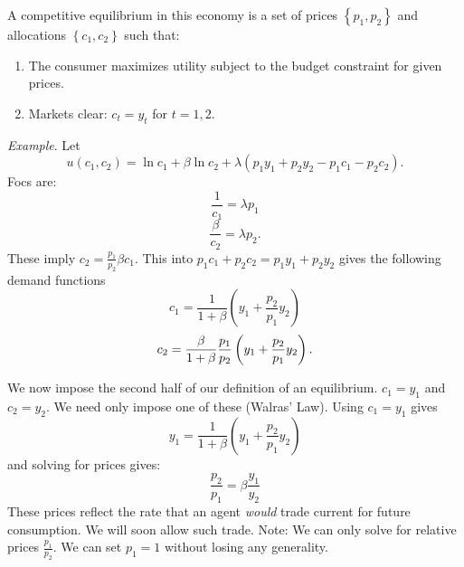 \documentclass{sebase}
\begin{document}
A competitive equilibrium in this economy is a set of prices $\left\{
p_{1},p_{2}\right\} $ and allocations $\left\{ c_{1},c_{2}\right\} $ such
that:

\begin{enumerate}
\item The consumer maximizes utility subject to the budget constraint for
given prices.

\item Markets clear: $c_{t}=y_{t}$ for $t=1,2$.
\end{enumerate}

\pagebreak

\textit{Example}. Let%
\begin{equation*}
u\left( c_{1},c_{2}\right) =\ln c_{1}+\beta \ln c_{2}+\lambda \left(
p_{1}y_{1}+p_{2}y_{2}-p_{1}c_{1}-p_{2}c_{2}\right) .
\end{equation*}%
Focs are:%
\begin{equation*}
\frac{1}{c_{1}}=\lambda p_{1}
\end{equation*}%
\begin{equation*}
\frac{\beta }{c_{2}}=\lambda p_{2}.
\end{equation*}%
These imply $c_{2}=\frac{p_{1}}{p_{2}}\beta c_{1}.$ This into $%
p_{1}c_{1}+p_{2}c_{2}=p_{1}y_{1}+p_{2}y_{2}$ gives the following demand
functions%
\begin{equation*}
c_{1}=\frac{1}{1+\beta }\left( y_{1}+\frac{p_{2}}{p_{1}}y_{2}\right)
\end{equation*}%
\begin{equation*}
c_{2}=\frac{\beta }{1+\beta }\frac{p_{1}}{p_{2}}\left( y_{1}+\frac{p_{2}}{%
p_{1}}y_{2}\right) .
\end{equation*}%
\pagebreak

We now impose the second half of our definition of an equilibrium. $%
c_{1}=y_{1}$ and $c_{2}=y_{2}$. We need only impose one of these (Walras'
Law). Using $c_{1}=y_{1}$ gives 
\begin{equation*}
y_{1}=\frac{1}{1+\beta }\left( y_{1}+\frac{p_{2}}{p_{1}}y_{2}\right)
\end{equation*}%
and solving for prices gives:%
\begin{equation*}
\frac{p_{2}}{p_{1}}=\beta \frac{y_{1}}{y_{2}}
\end{equation*}%
These prices reflect the rate that an agent \textit{would} trade current for
future consumption. We will soon allow such trade. Note: We can only solve
for relative prices $\frac{p_{1}}{p_{2}}$. We can set $p_{1}=1$ without
losing any generality.
\end{document}
